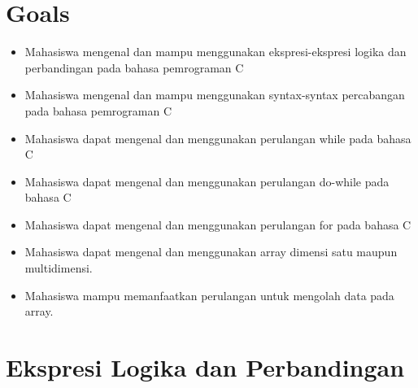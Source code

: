 \section{Goals}
\begin{itemize}
    \item Mahasiswa mengenal dan mampu menggunakan ekspresi-ekspresi logika dan perbandingan pada bahasa pemrograman C
    \item Mahasiswa mengenal dan mampu menggunakan syntax-syntax percabangan pada bahasa pemrograman C
    \item Mahasiswa dapat mengenal dan menggunakan perulangan while pada bahasa C
    \item Mahasiswa dapat mengenal dan menggunakan perulangan do-while pada bahasa C
    \item Mahasiswa dapat mengenal dan menggunakan perulangan for pada bahasa C
    \item Mahasiswa dapat mengenal dan menggunakan  array dimensi satu maupun multidimensi.
    \item Mahasiswa mampu memanfaatkan perulangan untuk mengolah data pada array.
\end{itemize}
\section{Ekspresi Logika dan Perbandingan}

